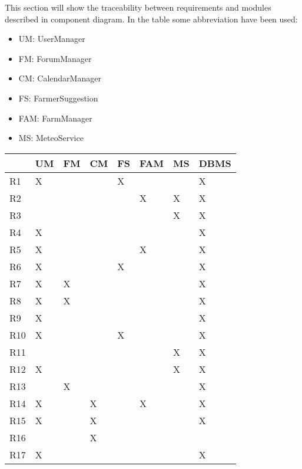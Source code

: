 This section will show the traceability between requirements and modules described in component diagram.
In the table some abbreviation have been used:\newline
\begin{itemize}
    \item UM: UserManager
    \item FM: ForumManager
    \item CM: CalendarManager
    \item FS: FarmerSuggestion
    \item FAM: FarmManager
    \item MS: MeteoService
\end{itemize}

\begin{table}[]
    \begin{tabular}{|l|l|l|l|l|l|l|l|}
    \hline
        & UM & FM & CM & FS & FAM & MS & DBMS \\ \hline
    R1  & X  &    &    & X  &     &    & X    \\ \hline
    R2  &    &    &    &    & X   & X  & X    \\ \hline
    R3  &    &    &    &    &     & X  & X    \\ \hline
    R4  & X  &    &    &    &     &    & X    \\ \hline
    R5  & X  &    &    &    & X   &    & X    \\ \hline
    R6  & X  &    &    & X  &     &    & X    \\ \hline
    R7  & X  & X  &    &    &     &    & X    \\ \hline
    R8  & X  & X  &    &    &     &    & X    \\ \hline
    R9  & X  &    &    &    &     &    & X    \\ \hline
    R10 & X  &    &    & X  &     &    & X    \\ \hline
    R11 &    &    &    &    &     & X  & X    \\ \hline
    R12 & X  &    &    &    &     & X  & X    \\ \hline
    R13 &    & X  &    &    &     &    & X    \\ \hline
    R14 & X  &    & X  &    & X   &    & X    \\ \hline
    R15 & X  &    & X  &    &     &    & X    \\ \hline
    R16 &    &    & X  &    &     &    &      \\ \hline
    R17 & X  &    &    &    &     &    & X    \\ \hline

\end{tabular}
\end{table}

